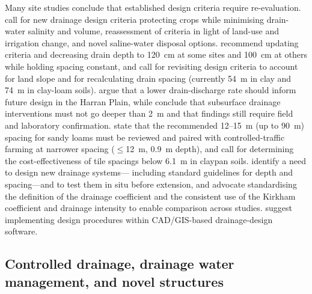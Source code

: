 Many site studies conclude that established design criteria require
re-evaluation. \textcite{Christen2001} call for new drainage design criteria
protecting crops while minimising drain-water salinity and volume,
reassessment of criteria in light of land-use and irrigation change, and novel
saline-water disposal options. \textcite{Muhammad2021} recommend updating
criteria and decreasing drain depth to 120~cm at some sites and 100~cm at
others while holding spacing constant, and \textcite{Malota2016} call for
revisiting design criteria to account for land slope and for recalculating
drain spacing (currently 54~m in clay and 74~m in clay-loam soils).
\textcite{Bahçeci2009} argue that a lower drain-discharge rate should inform
future design in the Harran Plain, while \textcite{Kahlown2002} conclude that
subsurface drainage interventions must not go deeper than 2~m and that findings
still require field and laboratory confirmation. \textcite{Mante2022} state
that the recommended 12--15~m (up to 90~m) spacing for sandy loams must be
reviewed and paired with controlled-traffic farming at narrower spacing
($\le$12~m, 0.9~m depth), and \textcite{Nelson2017} call for determining the
cost-effectiveness of tile spacings below 6.1~m in claypan soils.
\textcite{HajAmor2019} identify a need to design new drainage systems---
including standard guidelines for depth and spacing---and to test them in situ
before extension, and \textcite{Skaggs2017} advocate standardising the
definition of the drainage coefficient and the consistent use of the Kirkham
coefficient and drainage intensity to enable comparison across studies.
\textcite{GALLICHAND1992b} suggest implementing design procedures within
CAD/GIS-based drainage-design software.

\subsection{Controlled drainage, drainage water management, and novel structures}

